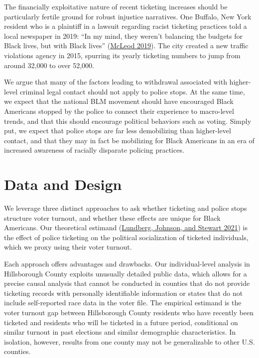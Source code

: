 \documentclass[
  12pt,
]{article}
\begin{document}
The financially exploitative nature of recent ticketing increases should be particularly fertile ground for robust injustice narratives. One Buffalo, New York resident who is a plaintiff in a lawsuit regarding racist ticketing practices told a local newspaper in 2019: ``In my mind, they weren't balancing the budgets for Black lives, but with Black lives'' (\protect\hyperlink{ref-McLeod2019}{McLeod 2019}). The city created a new traffic violations agency in 2015, spurring its yearly ticketing numbers to jump from around 32,000 to over 52,000.

We argue that many of the factors leading to withdrawal associated with higher-level criminal legal contact should not apply to police stops. At the same time, we expect that the national BLM movement should have encouraged Black Americans stopped by the police to connect their experience to macro-level trends, and that this should encourage political behaviors such as voting. Simply put, we expect that police stops are far less demobilizing than higher-level contact, and that they may in fact be mobilizing for Black Americans in an era of increased awareness of racially disparate policing practices.

\hypertarget{data-and-design}{%
\section*{Data and Design}\label{data-and-design}}

We leverage three distinct approaches to ask whether ticketing and police stops structure voter turnout, and whether these effects are unique for Black Americans. Our theoretical estimand (\protect\hyperlink{ref-Lundberg2021}{Lundberg, Johnson, and Stewart 2021}) is the effect of police ticketing on the political socialization of ticketed individuals, which we proxy using their voter turnout.

Each approach offers advantages and drawbacks. Our individual-level analysis in Hillsborough County exploits unusually detailed public data, which allows for a precise causal analysis that cannot be conducted in counties that do not provide ticketing records with personally identifiable information or states that do not include self-reported race data in the voter file. The empirical estimand is the voter turnout gap between Hillsborough County residents who have recently been ticketed and residents who will be ticketed in a future period, conditional on similar turnout in past elections and similar demographic characteristics. In isolation, however, results from one county may not be generalizable to other U.S. counties.
\end{document}
